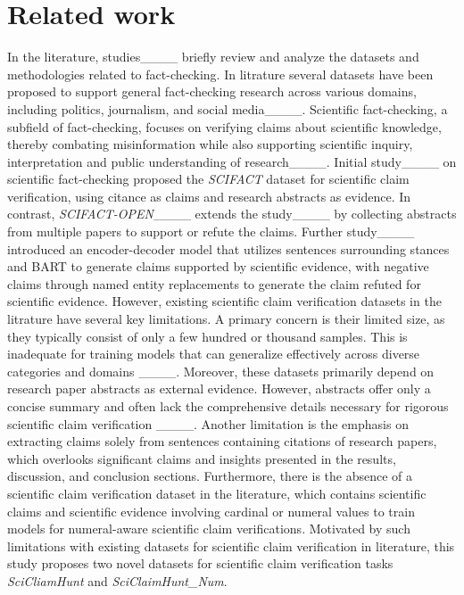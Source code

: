 \section{Related work}
In the literature, studies____ briefly review and analyze the datasets and methodologies related to fact-checking. In litrature several datasets have been proposed to support general fact-checking research across various domains, including politics, journalism, and social media____.
Scientific fact-checking, a subfield of fact-checking, focuses on verifying claims about scientific knowledge, thereby combating misinformation while also supporting scientific inquiry, interpretation and public understanding of research____. Initial  study____ on scientific fact-checking proposed the \textit{SCIFACT} dataset for scientific claim verification, using citance as claims and research abstracts as evidence. In contrast, \textit{SCIFACT-OPEN}____ extends the study____ by collecting abstracts from multiple papers to support or refute the claims. Further study____ 
introduced an encoder-decoder model that utilizes sentences surrounding stances and BART to generate claims supported by scientific evidence, with negative claims through named entity replacements to generate the claim refuted for scientific evidence. However, existing scientific claim verification datasets in the litrature have several key limitations. A primary concern is their limited size, as they typically consist of only a few hundred or thousand samples. This is inadequate for training models that can generalize effectively across diverse categories and domains ____. Moreover, these datasets primarily depend on research paper abstracts as external evidence. However, abstracts offer only a concise summary and often lack the comprehensive details necessary for rigorous scientific claim verification ____. Another limitation is the emphasis on extracting claims solely from sentences containing citations of research papers, which overlooks significant claims and insights presented in the results, discussion, and conclusion sections. Furthermore, there is the absence of a scientific claim verification dataset in the literature, which contains scientific claims and scientific evidence involving cardinal or numeral values to train models for numeral-aware scientific claim verifications. Motivated by such limitations with existing datasets for scientific claim verification in literature, this study proposes two novel datasets for scientific claim verification tasks \textit{SciCliamHunt} and \textit{ SciClaimHunt\_Num}.












